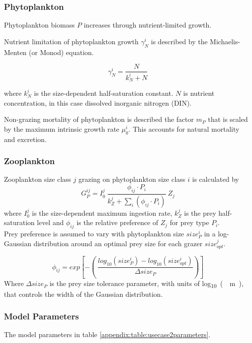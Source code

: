 \documentclass[template.tex]{subfiles}
\begin{document}
\subsubsection{Phytoplankton}
Phytoplankton biomass $P$ increases through  nutrient-limited growth. 

Nutrient limitation of phytoplankton growth $\gamma^i_N$ is described by the Michaelis-Menten (or Monod) equation.

\begin{equation}
    \gamma^i_N =  \frac{N}{k^i_N + N} 
\end{equation}

where $k^i_N$ is the size-dependent half-saturation constant. $N$ is nutrient concentration, in this case dissolved inorganic nitrogen (DIN).


Non-grazing mortality of phytoplankton is described the factor $m_P$ that is scaled by the maximum intrinsic growth rate $\mu^i_{0}$. This accounts for natural mortality and excretion.

\subsubsection{Zooplankton}
Zooplankton size class $j$ grazing on phytoplankton size class $i$ is calculated by
\begin{equation}
    G^{ij}_P = I^j_0 \ \frac{ \phi_{ij} \cdot P_i }{ k^j_Z + \sum_{i}(\phi_{ij} \cdot P_i) } \ Z_j
\end{equation}
where $I^j_0$ is the size-dependent maximum ingestion rate, $k^j_Z$ is the prey half-saturation level and $\phi_{ij}$ is the relative preference of $Z_j$ for prey type $P_i$.\\

Prey preference is assumed to vary with phytoplankton size $size^i_{P}$ in a log-Gaussian distribution around an optimal prey size for each grazer $size^j_{opt}$.

\begin{equation}
    \phi_{ij} = exp \left[ -\left( \ \frac{ log_{10}(size^i_{P}) - log_{10}(size^i_{opt}) }{ \Delta size_{P} } \right) \right]
\end{equation}
Where $\Delta size_{P}$ is the prey size tolerance parameter, with units of \unit{log_{10}(\mu m)}, that controls the width of the Gaussian distribution.\\

\subsubsection{Model Parameters}
The model parameters in table \ref{appendix:table:usecase2parameters}.
\end{document}
